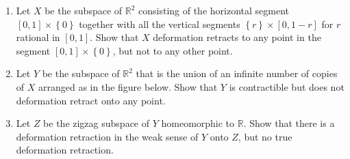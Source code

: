 \documentclass[twoside,10pt]{article}
\begin{document}
\begin{exer}[0: 6]
\begin{enumerate}
	\item Let $X$ be the subspace of $\mathbb{R}^{2}$ consisting of the horizontal segment $[0,1]\times \left\{ 0 \right\}$ together with all the vertical segments $\left\{ r \right\}\times [0,1-r]$ for $r$ rational in $[0,1]$. Show that $X$ deformation retracts to any point in the segment $[0,1] \times \left\{ 0 \right\}$, but not to any other point.

	\item Let $Y$ be the subspace of $\mathbb{R}^2$ that is the union of an infinite number of copies of $X$ arranged as in the figure below. Show that $Y$ is contractible but does not deformation retract onto any point.

	\item Let $Z$ be the zigzag subspace of $Y$ homeomorphic to $\mathbb{R}$. Show that there is a deformation retraction in the weak sense of $Y$ onto $Z$, but no true deformation retraction.
\end{enumerate}
\end{exer}
\end{document}
